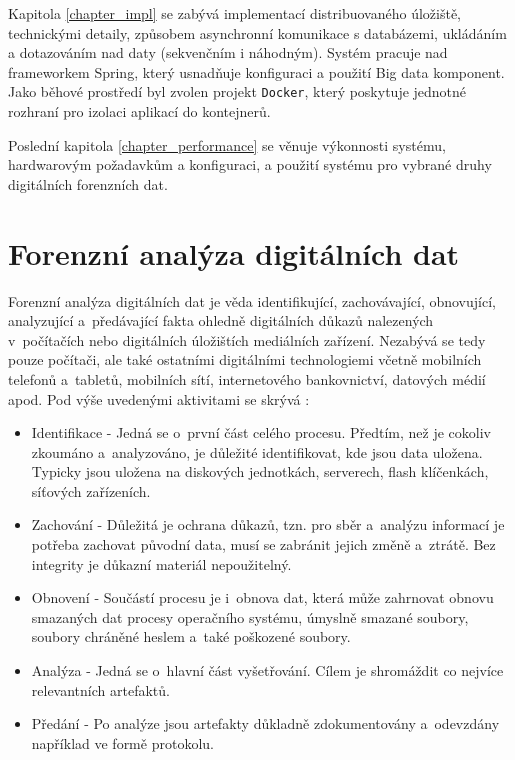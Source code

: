 Kapitola \ref{chapter_impl} se zabývá implementací distribuovaného úložiště,  technickými detaily, způsobem asynchronní komunikace s databázemi, ukládáním a dotazováním nad daty (sekvenčním i náhodným). Systém pracuje nad frameworkem Spring, který usnadňuje konfiguraci a použití Big data komponent. Jako běhové prostředí byl zvolen projekt \texttt{Docker}, který poskytuje jednotné rozhraní pro izolaci aplikací do kontejnerů.

Poslední kapitola \ref{chapter_performance} se věnuje výkonnosti systému, hardwarovým požadavkům a konfiguraci, a použití systému pro vybrané druhy digitálních forenzních dat.


\chapter{Forenzní analýza digitálních dat} \label{chapter1}
Forenzní analýza digitálních dat je věda identifikující, zachovávající, obnovující, analyzující a~předávající fakta ohledně digitálních důkazů nalezených v~počítačích nebo digitálních úložištích mediálních zařízení.
Nezabývá se tedy pouze počítači, ale také ostatními digitálními technologiemi včetně mobilních telefonů a~tabletů, mobilních sítí, internetového bankovnictví, datových médií apod. Pod výše uvedenými aktivitami se skrývá \cite{whatIsDigFor}:

\begin{itemize}
\item Identifikace - Jedná se o~první část celého procesu. Předtím, než je cokoliv zkoumáno a~analyzováno, je důležité identifikovat, kde jsou data uložena. Typicky jsou uložena na diskových jednotkách, serverech, flash klíčenkách, síťových zařízeních.

\item Zachování - Důležitá je ochrana důkazů, tzn. pro sběr a~analýzu informací je potřeba zachovat původní data, musí se zabránit jejich změně a~ztrátě. Bez integrity je důkazní materiál nepoužitelný.

\item Obnovení - Součástí procesu je i~obnova dat, která může zahrnovat obnovu smazaných dat procesy operačního systému, úmyslně smazané soubory, soubory chráněné heslem a~také poškozené soubory.

\item Analýza - Jedná se o~hlavní část vyšetřování. Cílem je shromáždit co nejvíce relevantních artefaktů.

\item Předání - Po analýze jsou artefakty důkladně zdokumentovány a~odevzdány například ve formě protokolu.
\end{itemize}

